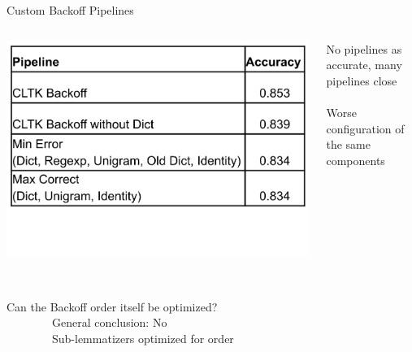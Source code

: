 \documentclass[aspectratio=169,xcolor=dvipsnames]{beamer}
\begin{document}
\begin{frame}[t]{Custom Backoff Pipelines}
\ \\
 \begin{columns}
        \begin{column}{0.5\textwidth}
    \includegraphics[width=1\textwidth]{custom_pipeline_performances_v3.png}
        \end{column}
        \begin{column}{0.4\textwidth}
            No pipelines as accurate, many pipelines close \\ \ \\
            Worse configuration of the same components
        \end{column}
    \end{columns} 
    \ \\
    {\large Can the Backoff order itself be optimized?} \\
    \ \ \ \ \ \ \ \ General conclusion: No \\
    \ \ \ \ \ \ \ \ Sub-lemmatizers optimized for order

    
\end{frame}
\end{document}
